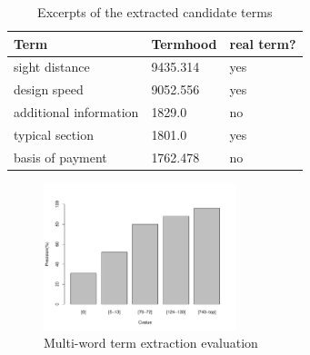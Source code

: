 \documentclass[Journal, BackFigs, DoubleSpace]{ascelike} %
\begin{document}
%
\begin{table} [t]
	\caption{Excerpts of the extracted candidate terms}
	\label{table:term_evaluation}
	\centering
	\small
	\renewcommand{\arraystretch}{1.25}
	\begin{tabular}{l l l}
		\hline
		\textbf{Term} & \textbf{Termhood} & \textbf{real term?}\\
		\hline
		sight distance		& 9435.314 & yes\\
		design speed & 9052.556 & yes \\
		additional information & 1829.0 & no\\
		typical section & 1801.0  & yes\\
		basis of payment & 1762.478 & no\\
		\hline
	\end{tabular}
	
	\normalsize
\end{table}

\begin{figure}[t]
	\centering
	\includegraphics[width=0.5\textwidth]{Figure3_term_precision}
	\caption{Multi-word term extraction evaluation}
	\label{fig:term_precision}
\end{figure}
%
\end{document}
